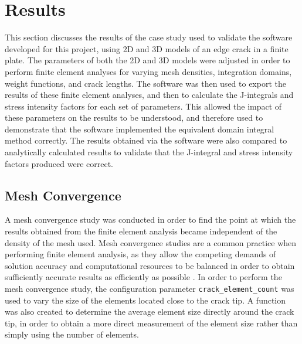 \chapter{Results}\label{sec:results}

This section discusses the results of the case study used to validate the software developed for this project, using 2D and 3D models of an edge crack in a finite plate. The parameters of both the 2D and 3D models were adjusted in order to perform finite element analyses for varying mesh densities, integration domains, weight functions, and crack lengths. The software was then used to export the results of these finite element analyses, and then to calculate the J-integrals and stress intensity factors for each set of parameters. This allowed the impact of these parameters on the results to be understood, and therefore used to demonstrate that the software implemented the equivalent domain integral method correctly. The results obtained via the software were also compared to analytically calculated results to validate that the J-integral and stress intensity factors produced were correct.

\newpage
\section{Mesh Convergence}

A mesh convergence study was conducted in order to find the point at which the results obtained from the finite element analysis became independent of the density of the mesh used. Mesh convergence studies are a common practice when performing finite element analysis, as they allow the competing demands of solution accuracy and computational resources to be balanced in order to obtain sufficiently accurate results as efficiently as possible \cite{hellen_how_2001}. In order to perform the mesh convergence study, the configuration parameter \texttt{crack\_element\_count} was used to vary the size of the elements located close to the crack tip. A function was also created to determine the average element size directly around the crack tip, in order to obtain a more direct measurement of the element size rather than simply using the number of elements.

